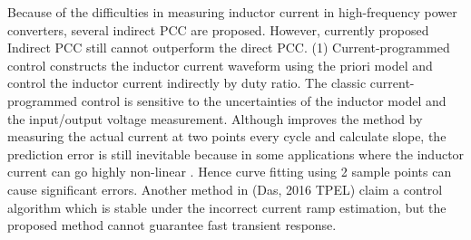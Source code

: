 Because of the difficulties in measuring inductor current in high-frequency power converters, several indirect PCC are proposed. However, currently proposed Indirect PCC  still cannot outperform the direct PCC.
(1)	Current-programmed control constructs the inductor current waveform using the priori model and control the inductor current indirectly by duty ratio.
The classic current-programmed control \cite{Chendragan2003} is sensitive to the uncertainties of the inductor model and the input/output voltage measurement. Although \cite{Taeed2014} improves the method by measuring the actual current at two points every cycle and calculate slope, the prediction error is still inevitable because in some applications where the inductor current can go highly non-linear \cite{Ahsanuzzamanprodic2012apec} \cite{DiCapua2016}. Hence curve fitting using 2 sample points can cause significant errors. Another method in (Das, 2016 TPEL) claim a control algorithm which is stable under the incorrect current ramp estimation, but the proposed method cannot guarantee fast transient response.